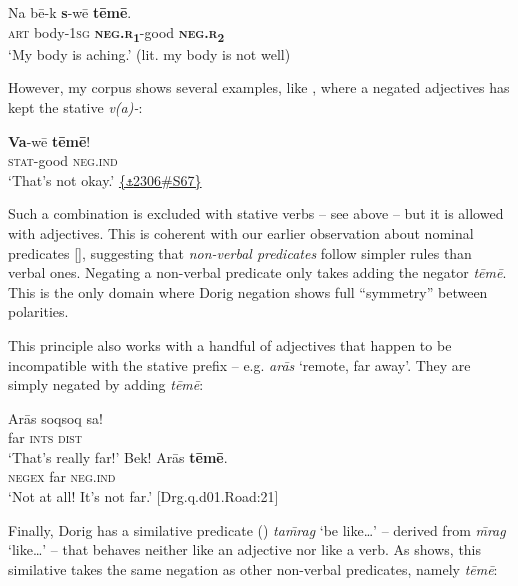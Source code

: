 \documentclass[output=paper,colorlinks,citecolor=brown,draft]{langscibook}
\begin{document}
\ea\label{ex:dor:ache} 
    \gll  Na bē-k \textbf{s}-wē \textbf{tēmē}.\\ 
          \textsc{art} body-\textsc{1sg} \textbf{\textsc{neg.r}}\textbf{\textsubscript{1}}-good \textbf{\textsc{neg.r}}\textbf{\textsubscript{2}} \\
    \glt ‘My body is aching.’ (lit. my body is not well)  
\z 

\noindent However, my corpus shows several examples, like , where a negated adjectives has kept the stative \textit{v(a)-}:

\ea\label{ex:dor:ok}
    \gll \textbf{Va}-wē \textbf{tēmē}!\\
         \textsc{stat-}good \textsc{neg.ind}\\
    \glt ‘That’s not okay.’ \quad \href{https://doi.org/10.24397/pangloss-0002306#S67}{\{\texttt{⚓}2306\#S67\}}
\z 

\noindent Such a combination is excluded with stative verbs – see  above – but it is allowed with adjectives. This is coherent with our earlier observation about nominal predicates [], suggesting that \textit{non-verbal predicates} follow simpler rules than verbal ones. Negating a non-verbal predicate only takes adding the negator \textit{tēmē}. This is the only domain where Dorig negation shows full “symmetry” between polarities. 

This principle also works with a handful of adjectives that happen to be incompatible with the stative prefix -- e.g.  \textit{arās} ‘remote, far away’. They are simply negated by adding \textit{tēmē}:


\ea\label{ex:dor:far}
    \begin{xlist}
    \label{ex:dor:far1}
        \gll  Arās soqsoq sa!\\ 
               far \textsc{ints} \textsc{dist} \\ 
        \glt ‘That’s really far!'
    \label{ex:dor:far2}
        \gll  Bek! Arās \textbf{tēmē}.\\ 
               \textsc{negex} far \textsc{neg.ind}\\
        \glt ‘Not at all! It’s not far.’  \quad
     {\small [Drg.q.d01.Road:21]}  
    \end{xlist}
\z 

Finally, Dorig has a similative predicate (\citealt[1052]{FrançoisForthcominga}) \textit{ta\={m}rag} ‘be like…’ -- derived from \textit{\={m}rag} ‘like…’ -- that behaves neither like an adjective nor like a verb. As  shows, this similative takes the same negation as other non-verbal predicates, namely \textit{tēmē}: 
\end{document}
